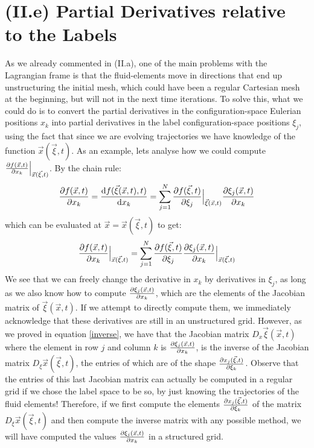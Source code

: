 \documentclass[11pt, a4paper]{article} %
\begin{document}
\section*{(II.e) Partial Derivatives relative to the Labels}
As we already commented in (II.a), one of the main problems with the Lagrangian frame is that the fluid-elements move in directions that end up unstructuring the initial mesh, which could have been a regular Cartesian mesh at the beginning, but will not in the next time iterations. To solve this, what we could do is to convert the partial derivatives in the configuration-space Eulerian positions $x_k$ into partial derivatives in the label configuration-space positions $\xi_j$, using the fact that since we are evolving trajectories we have knowledge of the function $\vec{x}(\vec{\xi},t)$. As an example, lets analyse how we could compute $\pdv{f(\vec{x},t)}{x_k}\Big\rvert_{\vec{x}(\vec{\xi},t)}$. By the chain rule:
\begin{equation}
\pdv{f(\vec{x},t)}{x_k}=\dv{f(\vec{\xi}(\vec{x},t),t)}{x_k}=\sum_{j=1}^N \pdv{f(\vec{\xi},t)}{\xi_j}\Big\rvert_{\vec{\xi}(\vec{x},t)} \pdv{\xi_j(\vec{x},t)}{x_k}
\end{equation}
which can be evaluated at $\vec{x}=\vec{x}(\vec{\xi},t)$ to get:
\begin{equation}
\pdv{f(\vec{x},t)}{x_k}\Big\rvert_{\vec{x}(\vec{\xi},t)}=\sum_{j=1}^N \pdv{f(\vec{\xi},t)}{\xi_j} \pdv{\xi_j(\vec{x},t)}{x_k}\Big\rvert_{\vec{x}(\vec{\xi},t)}
\end{equation}
We see that we can freely change the derivative in $x_k$ by derivatives in $\xi_j$, as long as we also know how to compute $\pdv{\xi_j(\vec{x},t)}{x_k}$, which are the elements of the Jacobian matrix of $\vec{\xi}(\vec{x},t)$. If we attempt to directly compute them, we immediately acknowledge that these derivatives are still in an unstructured grid. However, as we proved in equation \eqref{inverse}, we have that the Jacobian matrix $D_x \vec{\xi}(\vec{x},t)$ where the element in row $j$ and column $k$ is $\pdv{\xi_j(\vec{x},t)}{x_k}$, is the inverse of the Jacobian matrix $D_\xi \vec{x}(\vec{\xi},t)$, the entries of which are of the shape $\pdv{x_j(\vec{\xi},t)}{\xi_k}$. Observe that the entries of this last Jacobian matrix can actually be computed in a regular grid if we chose the label space to be so, by just knowing the trajectories of the fluid elements! Therefore, if we first compute the elements $\pdv{x_j(\vec{\xi},t)}{\xi_k}$ of the matrix $D_\xi \vec{x}(\vec{\xi},t)$ and then compute the inverse matrix with any possible method, we will have computed the values $\pdv{\xi_j(\vec{x},t)}{x_k}$ in a structured grid.
\end{document}
